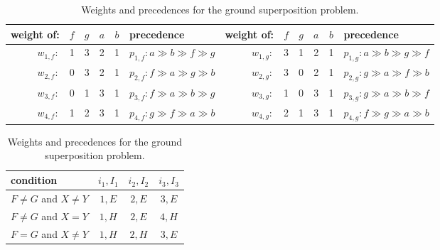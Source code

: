 \begin{table}
\begin{center}
\begin{tabular}{r@{\hskip 0.5em}c c c c@{\hskip 0.5em} |@{\hskip 0.5em} l@{\hskip 1em} ||@{\hskip 0.5em} r@{\hskip 0.5em} c c c c@{\hskip 0.5em} |@{\hskip 0.5em} l}
  weight of: & $f$ & $g$ & $a$ & $b$ & precedence
  & weight of: & $f$ & $g$ & $a$ & $b$ & precedence \\ \hline
  $w_{1,f}:$  & 1   & 3   & 2   & 1   & $p_{1,f}: a \gg b \gg f \gg g$ &
  $w_{1,g}:$  & 3   & 1   & 2   & 1   & $p_{1,g}: a \gg b \gg g \gg f$ \\ \hline
  $w_{2,f}:$  & 0   & 3   & 2   & 1   & $p_{2,f}: f \gg a \gg g \gg b$ &
  $w_{2,g}:$  & 3   & 0   & 2   & 1   & $p_{2,g}: g \gg a \gg f \gg b$ \\ \hline
  $w_{3,f}:$  & 0   & 1   & 3   & 1   & $p_{3,f}: f \gg a \gg b \gg g$ &
  $w_{3,g}:$  & 1   & 0   & 3   & 1   & $p_{3,g}: g \gg a \gg b \gg f$ \\ \hline
  $w_{4,f}:$  & 1   & 2   & 3   & 1   & $p_{4,f}: g \gg f \gg a \gg b$ &
  $w_{4,g}:$  & 2   & 1   & 3   & 1   & $p_{4,g}: f \gg g \gg a \gg b$ \\ \hline
\end{tabular}

\hspace*{0.5em}

\begin{tabular}{l@{\hskip 1.05em} || c | c | c}
\hline
condition & $i_1, I_1$ & $i_2, I_2$ & $i_3, I_3$ \\ \hline
$F \not = G$ and $X \not= Y$ & $1,E$ & $2, E$ & $3, E$ \\
$F \not = G$ and $X = Y$ & $1, H$ & $2, E$ & $4, H$ \\
$F = G$ and $X \not= Y$ & $1, H$ & $2, H$ & $3, E$
\end{tabular}
\hspace*{0.5em}
\caption{Weights and precedences for the ground superposition problem.}
\end{center}
\label{tab:ground-sup}
\end{table}
